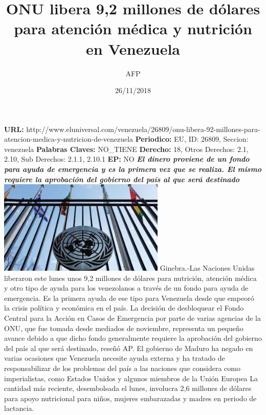 \documentclass{article}%
\title{\textbf{ONU libera 9,2 millones de dólares para atención médica y nutrición en Venezuela}}%
\author{AFP}%
\date{26/11/2018}%
\begin{document}
%
\normalsize%
\maketitle%
\textbf{URL: }%
http://www.eluniversal.com/venezuela/26809/onu{-}libera{-}92{-}millones{-}para{-}atencion{-}medica{-}y{-}nutricion{-}de{-}venezuela\newline%
%
\textbf{Periodico: }%
EU, %
ID: %
26809, %
Seccion: %
venezuela\newline%
%
\textbf{Palabras Claves: }%
NO\_TIENE\newline%
%
\textbf{Derecho: }%
18, %
Otros Derechos: %
2.1, 2.10, %
Sub Derechos: %
2.1.1, 2.10.1\newline%
%
\textbf{EP: }%
NO\newline%
\newline%
%
\textbf{\textit{El dinero proviene de un fondo para ayuda de emergencia y es la primera vez que se realiza. El mismo requiere la aprobación del gobierno del país al que será destinado}}%
\newline%
\newline%
%
\includegraphics[width=300px]{259.jpg}%
\newline%
%
Ginebra.{-}Las Naciones Unidas liberaron este lunes unos 9,2 millones de dólares para nutrición, atención médica y otro tipo de ayuda para los venezolanos a través de un fondo para ayuda de emergencia.%
\newline%
%
Es la primera ayuda de ese tipo para Venezuela desde que empeoró la crisis política y económica en el país.%
\newline%
%
La decisión de desbloquear el Fondo Central para la Acción en Casos de Emergencia por parte de varias agencias de la ONU, que fue tomada desde mediados de noviembre, representa un pequeño avance debido a que dicho fondo generalmente requiere la aprobación del gobierno del país al que será destinado, reseñó AP.%
\newline%
%
El gobierno de Maduro ha negado en varias ocasiones que Venezuela necesite ayuda externa y ha tratado de responsabilizar de los problemas del país a las naciones que considera como imperialistas, como Estados Unidos y algunos miembros de la Unión Europea%
\newline%
%
La cantidad más reciente, desembolsada el lunes, involucra 2,6 millones de dólares para apoyo nutricional para niños, mujeres embarazadas y madres en periodo de lactancia.%
\newline%
%
\end{document}

